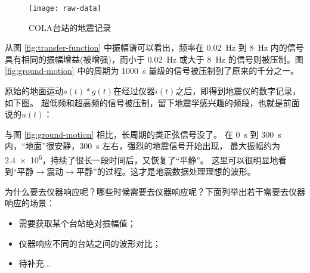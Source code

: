 \begin{figure}[H]
\centering
\texttt{[image: raw-data]}
\caption{COLA台站的地震记录}
\end{figure}

从图 \ref{fig:transfer-function} 中振幅谱可以看出，频率在 \SI{0.02}{\Hz}
到 \SI{8}{\Hz} 内的信号具有相同的振幅增益(被增强)，而小于 \SI{0.02}{\Hz}
或大于 \SI{8}{\Hz} 的信号则被压制。图 \ref{fig:ground-motion} 中的周期为
\SI{1000}{\s} 量级的信号被压制到了原来的千分之一。

原始的地面运动$s(t)*g(t)$在经过仪器$i(t)$之后，即得到地震仪的数字记录，如下图。
超低频和超高频的信号被压制，留下地震学感兴趣的频段，也就是前面说的$u(t)$：

与图 \ref{fig:ground-motion} 相比，长周期的类正弦信号没了。
在 \SI{0}{\s} 到 \SI{300}{\s} 内，``地面''很安静，\SI{300}{\s} 左右，强烈的地震信号开始出现，
最大振幅约为 \num{2.4e6}，持续了很长一段时间后，又恢复了``平静''。
这里可以很明显地看到``平静$\rightarrow$震动$\rightarrow$平静''的过程。这才是地震数据处理理想的波形。

为什么要去仪器响应呢？哪些时候需要去仪器响应呢？下面列举出若干需要去仪器响应的场景：
\begin{itemize}
\item 需要获取某个台站绝对振幅值；
\item 仪器响应不同的台站之间的波形对比；
\item 待补充...
\end{itemize}
